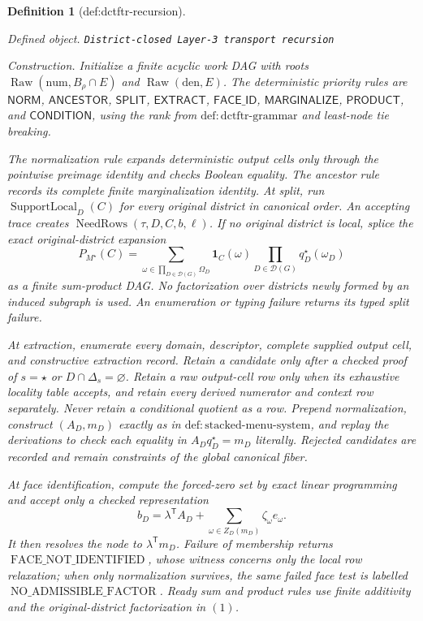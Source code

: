 \documentclass{article}
\newtheorem{definition}{Definition}
\begin{document}
\begin{definition}[def:dctftr-recursion]\label{def:dctftr-recursion}
\par\smallskip\noindent\emph{Defined object.} \texttt{District-\allowbreak{}closed Layer-\allowbreak{}3 transport recursion}
\par\smallskip\noindent\emph{Construction.} Initialize a finite acyclic work DAG with roots \(\operatorname{Raw}(\mathrm{num},B_\rho\cap E)\) and \(\operatorname{Raw}(\mathrm{den},E)\).  The deterministic priority rules are \(\mathsf{NORM}\), \(\mathsf{ANCESTOR}\), \(\mathsf{SPLIT}\), \(\mathsf{EXTRACT}\), \(\mathsf{FACE\_ID}\), \(\mathsf{MARGINALIZE}\), \(\mathsf{PRODUCT}\), and \(\mathsf{CONDITION}\), using the rank from \(\mathrm{def:dctftr\text{-}grammar}\) and least-node tie breaking.

The normalization rule expands deterministic output cells only through the pointwise preimage identity and checks Boolean equality.  The ancestor rule records its complete finite marginalization identity.  At split, run \(\operatorname{SupportLocal}_D(C)\) for every original district in canonical order.  An accepting trace creates \(\operatorname{NeedRows}(\tau,D,C,b,\ell)\).  If no original district is local, splice the exact original-district expansion
\[
P_{M^\star}(C)=
\sum_{\omega\in\prod_{D\in\mathcal D(G)}\Omega_D}
\mathbf 1_C(\omega)
\prod_{D\in\mathcal D(G)}q_D^\star(\omega_D)
\tag{1}
\]
as a finite sum-product DAG.  No factorization over districts newly formed by an induced subgraph is used.  An enumeration or typing failure returns its typed split failure.

At extraction, enumerate every domain, descriptor, complete supplied output cell, and constructive extraction record.  Retain a candidate only after a checked proof of \(s=\star\) or \(D\cap\Delta_s=\varnothing\).  Retain a raw output-cell row only when its exhaustive locality table accepts, and retain every derived numerator and context row separately.  Never retain a conditional quotient as a row.  Prepend normalization, construct \((A_D,m_D)\) exactly as in \(\mathrm{def:stacked\text{-}menu\text{-}system}\), and replay the derivations to check each equality in \(A_Dq_D^\star=m_D\) literally.  Rejected candidates are recorded and remain constraints of the global canonical fiber.

At face identification, compute the forced-zero set by exact linear programming and accept only a checked representation
\[
b_D=\lambda^{\mathsf T}A_D+
\sum_{\omega\in Z_D(m_D)}\zeta_\omega e_\omega.
\tag{2}
\]
It then resolves the node to \(\lambda^{\mathsf T}m_D\).  Failure of membership returns \(\operatorname{FACE\_NOT\_IDENTIFIED}\), whose witness concerns only the local row relaxation; when only normalization survives, the same failed face test is labelled \(\operatorname{NO\_ADMISSIBLE\_FACTOR}\).  Ready sum and product rules use finite additivity and the original-district factorization in \((1)\).


\end{definition}
\end{document}
